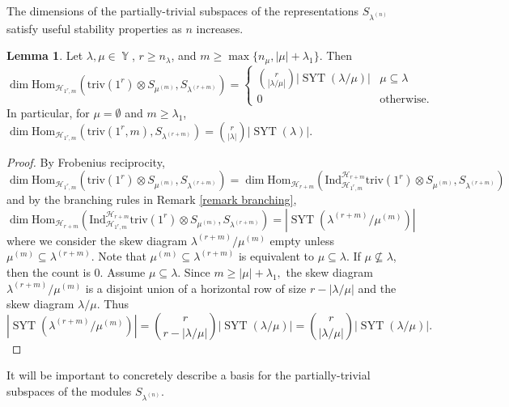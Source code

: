 \documentclass[12pt,reqno]{amsart}
\theoremstyle{definition}
\newtheorem{lem}[thm]{Lemma}
\DeclareMathOperator{\cH}{\mathcal{H}}
\DeclareMathOperator{\SYT}{\mathrm{SYT}}
\DeclareMathOperator{\Par}{\mathbb{Y}}
\begin{document}
The dimensions of the partially-trivial subspaces of the representations $S_{\lambda^{(n)}}$ satisfy useful stability properties as $n$ increases.

\begin{lem}\label{lem stable partial invar dims}
    Let $\lambda, \mu \in \Par$, $r \geq n_{\lambda}$, and $m \geq \max\{ n_{\mu}, |\mu| + \lambda_1\}.$ Then 
    $$\dim \mathrm{Hom}_{\cH_{1^r,m}}\left( \mathrm{triv}(1^r) \otimes S_{\mu^{(m)}}, S_{\lambda^{(r+m)}} \right) = \begin{cases}
       \binom{r}{|\lambda/\mu|} |\SYT(\lambda/\mu)| & \mu \subseteq \lambda\\
        0 & \text{otherwise}.
    \end{cases} $$
    In particular, for $\mu = \emptyset$ and $m \geq \lambda_1$, $\dim \mathrm{Hom}_{\cH_{1^r,m}}\left( \mathrm{triv}(1^r,m), S_{\lambda^{(r+m)}} \right) = \binom{r}{ |\lambda|} |\SYT(\lambda)|.$
\end{lem}
\begin{proof}
    By Frobenius reciprocity, 
    $$\dim \mathrm{Hom}_{\cH_{1^r,m}}\left( \mathrm{triv}(1^r) \otimes S_{\mu^{(m)}}, S_{\lambda^{(r+m)}} \right) = \dim \mathrm{Hom}_{\cH_{r+m}} \left(\mathrm{Ind}_{\cH_{1^r,m}}^{\cH_{r+m}}\mathrm{triv}(1^r) \otimes S_{\mu^{(m)}}, S_{\lambda^{(r+m)}} \right)$$ and by the branching rules in Remark \ref{remark branching}, 
    $$\dim \mathrm{Hom}_{\cH_{r+m}} \left(\mathrm{Ind}_{\cH_{1^r,m}}^{\cH_{r+m}}\mathrm{triv}(1^r) \otimes S_{\mu^{(m)}}, S_{\lambda^{(r+m)}} \right) = |\SYT( \lambda^{(r+m)}/\mu^{(m)}) |$$ where we consider the skew diagram $\lambda^{(r+m)}/\mu^{(m)}$ empty unless $\mu^{(m)} \subseteq \lambda^{(r+m)}$. Note that $\mu^{(m)} \subseteq \lambda^{(r+m)}$ is equivalent to $\mu \subseteq \lambda.$ If $\mu \not\subseteq \lambda$, then the count is $0.$ Assume $\mu \subseteq \lambda$. Since $m \geq |\mu| + \lambda_1,$ the skew diagram $\lambda^{(r+m)}/\mu^{(m)}$ is a disjoint union of a horizontal row of size $r-|\lambda/\mu|$ and the skew diagram $\lambda/\mu.$ Thus 
    $$|\SYT( \lambda^{(r+m)}/\mu^{(m)}) | = \binom{r}{r-|\lambda/\mu|} |\SYT(\lambda/\mu)| = \binom{r}{|\lambda/\mu|} |\SYT(\lambda/\mu)|.$$
\end{proof}

It will be important to concretely describe a basis for the partially-trivial subspaces of the modules $S_{\lambda^{(n)}}.$
\end{document}
